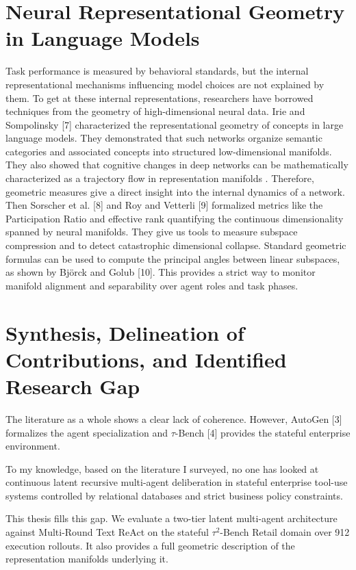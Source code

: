 \documentclass[a4paper, 12pt]{report}
\begin{document}
\section{Neural Representational Geometry in Language Models}
Task performance is measured by behavioral standards, but the internal representational mechanisms influencing model choices are not explained by them. To get at these internal representations, researchers have borrowed techniques from the geometry of high-dimensional neural data. Irie and Sompolinsky [7] characterized the representational geometry of concepts in large language models. They demonstrated that such networks organize semantic categories and associated concepts into structured low-dimensional manifolds. They also showed that cognitive changes in deep networks can be mathematically characterized as a trajectory flow in representation manifolds . Therefore, geometric measures give a direct insight into the internal dynamics of a network. Then Sorscher et al. [8] and Roy and Vetterli [9] formalized metrics like the Participation Ratio and effective rank quantifying the continuous dimensionality spanned by neural manifolds. They give us tools to measure subspace compression and to detect catastrophic dimensional collapse. Standard geometric formulas can be used to compute the principal angles between linear subspaces, as shown by Björck and Golub [10]. This provides a strict way to monitor manifold alignment and separability over agent roles and task phases.

\section{Synthesis, Delineation of Contributions, and Identified Research Gap}
The literature as a whole shows a clear lack of coherence. However, AutoGen [3] formalizes the agent specialization and $\tau$-Bench [4] provides the stateful enterprise environment.

To my knowledge, based on the literature I surveyed, no one has looked at continuous latent recursive multi-agent deliberation in stateful enterprise tool-use systems controlled by relational databases and strict business policy constraints.

This thesis fills this gap. We evaluate a two-tier latent multi-agent architecture against Multi-Round Text ReAct on the stateful $\tau^2$-Bench Retail domain over 912 execution rollouts. It also provides a full geometric description of the representation manifolds underlying it.
\end{document}

